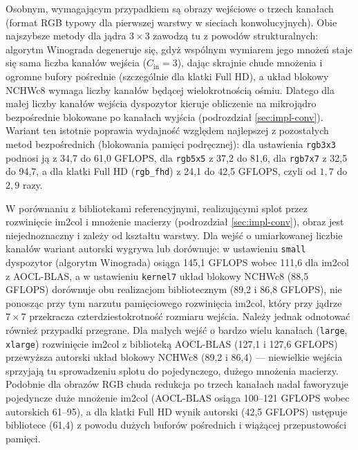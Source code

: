 \documentclass[a4paper,12pt]{book} %
\begin{document}
Osobnym, wymagającym przypadkiem są obrazy wejściowe o trzech kanałach (format RGB typowy dla pierwszej warstwy w sieciach konwolucyjnych). Obie najszybsze metody dla jądra $3 \times 3$ zawodzą tu z powodów strukturalnych: algorytm Winograda degeneruje się, gdyż wspólnym wymiarem jego mnożeń staje się sama liczba kanałów wejścia ($C_{\mathrm{in}} = 3$), dając skrajnie chude mnożenia i ogromne bufory pośrednie (szczególnie dla klatki Full HD), a układ blokowy NCHWc8 wymaga liczby kanałów będącej wielokrotnością ośmiu. Dlatego dla małej liczby kanałów wejścia dyspozytor kieruje obliczenie na mikrojądro bezpośrednie blokowane po kanałach wyjścia (podrozdział \ref{sec:impl-conv}). Wariant ten istotnie poprawia wydajność względem najlepszej z pozostałych metod bezpośrednich (blokowania pamięci podręcznej): dla ustawienia \texttt{rgb3x3} podnosi ją z 34,7 do 61,0 GFLOPS, dla \texttt{rgb5x5} z 37,2 do 81,6, dla \texttt{rgb7x7} z 32,5 do 94,7, a dla klatki Full HD (\texttt{rgb\_fhd}) z 24,1 do 42,5 GFLOPS, czyli od $1{,}7$ do $2{,}9$ razy.

W porównaniu z bibliotekami referencyjnymi, realizującymi splot przez rozwinięcie im2col i mnożenie macierzy (podrozdział \ref{sec:impl-conv}), obraz jest niejednoznaczny i zależy od kształtu warstwy. Dla wejść o umiarkowanej liczbie kanałów wariant autorski wygrywa lub dorównuje: w ustawieniu \texttt{small} dyspozytor (algorytm Winograda) osiąga 145,1 GFLOPS wobec 111,6 dla im2col z AOCL-BLAS, a w ustawieniu \texttt{kernel7} układ blokowy NCHWc8 (88,5 GFLOPS) dorównuje obu realizacjom bibliotecznym (89,2 i 86,8 GFLOPS), nie ponosząc przy tym narzutu pamięciowego rozwinięcia im2col, który przy jądrze $7 \times 7$ przekracza czterdziestokrotność rozmiaru wejścia. Należy jednak odnotować również przypadki przegrane. Dla małych wejść o bardzo wielu kanałach (\texttt{large}, \texttt{xlarge}) rozwinięcie im2col z biblioteką AOCL-BLAS (127,1 i 127,6 GFLOPS) przewyższa autorski układ blokowy NCHWc8 (89,2 i 86,4) --- niewielkie wejścia sprzyjają tu sprowadzeniu splotu do pojedynczego, dużego mnożenia macierzy. Podobnie dla obrazów RGB chuda redukcja po trzech kanałach nadal faworyzuje pojedyncze duże mnożenie im2col (AOCL-BLAS osiąga 100--121 GFLOPS wobec autorskich 61--95), a dla klatki Full HD wynik autorski (42,5 GFLOPS) ustępuje bibliotece (61,4) z powodu dużych buforów pośrednich i wiążącej przepustowości pamięci.
\end{document}
